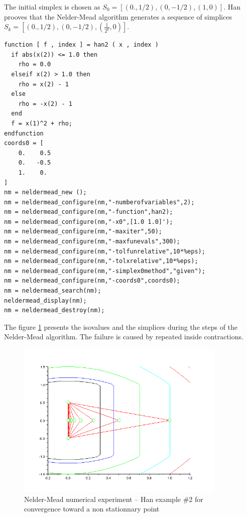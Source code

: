 The initial simplex is chosen as $S_0 = [(0.,1/2),(0,-1/2),(1,0)]$.
Han prooves that the Nelder-Mead algorithm generates a sequence of simplices
$S_k = [(0.,1/2),(0,-1/2),(\frac{1}{2^k},0)]$.

\lstset{language=scilabscript}
\begin{lstlisting}
function [ f , index ] = han2 ( x , index )
  if abs(x(2)) <= 1.0 then
    rho = 0.0
  elseif x(2) > 1.0 then
    rho = x(2) - 1
  else
    rho = -x(2) - 1
  end
  f = x(1)^2 + rho;
endfunction
coords0 = [
    0.    0.5  
    0.   -0.5  
    1.    0.   
]
nm = neldermead_new ();
nm = neldermead_configure(nm,"-numberofvariables",2);
nm = neldermead_configure(nm,"-function",han2);
nm = neldermead_configure(nm,"-x0",[1.0 1.0]');
nm = neldermead_configure(nm,"-maxiter",50);
nm = neldermead_configure(nm,"-maxfunevals",300);
nm = neldermead_configure(nm,"-tolfunrelative",10*%eps);
nm = neldermead_configure(nm,"-tolxrelative",10*%eps);
nm = neldermead_configure(nm,"-simplex0method","given");
nm = neldermead_configure(nm,"-coords0",coords0);
nm = neldermead_search(nm);
neldermead_display(nm);
nm = neldermead_destroy(nm);
\end{lstlisting}


The figure \ref{fig-nm-numexp-han2} presents the isovalues and the 
simplices during the steps of the Nelder-Mead algorithm.
The failure is caused by repeated inside contractions.

\begin{figure}
\begin{center}
\includegraphics[width=10cm]{neldermeadmethod/han2-history-simplex.png}
\end{center}
\caption{Nelder-Mead numerical experiment -- Han example \#2 for convergence toward
a non stationnary point}
\label{fig-nm-numexp-han2}
\end{figure}

